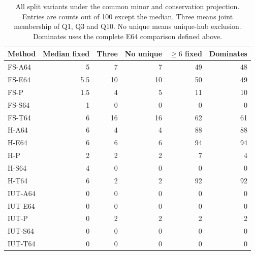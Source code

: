 \begin{table}[htbp]\centering\small\caption{All split variants under the common minor and conservation projection. Entries are counts out of 100 except the median. Three means joint membership of Q1, Q3 and Q10. No unique means unique-hub exclusion. Dominates uses the complete E64 comparison defined above.}\label{tab:split-methods}

\begin{tabular}{lrrrrr}\toprule Method & Median fixed & Three & No unique & $\ge6$ fixed & Dominates\\\midrule

FS-A64 & 5 & 7 & 7 & 49 & 48\\

FS-E64 & 5.5 & 10 & 10 & 50 & 49\\

FS-P & 1.5 & 4 & 5 & 11 & 10\\

FS-S64 & 1 & 0 & 0 & 0 & 0\\

FS-T64 & 6 & 16 & 16 & 62 & 61\\

H-A64 & 6 & 4 & 4 & 88 & 88\\

H-E64 & 6 & 6 & 6 & 94 & 94\\

H-P & 2 & 2 & 2 & 7 & 4\\

H-S64 & 4 & 0 & 0 & 0 & 0\\

H-T64 & 6 & 2 & 2 & 92 & 92\\

IUT-A64 & 0 & 0 & 0 & 0 & 0\\

IUT-E64 & 0 & 0 & 0 & 0 & 0\\

IUT-P & 0 & 2 & 2 & 2 & 2\\

IUT-S64 & 0 & 0 & 0 & 0 & 0\\

IUT-T64 & 0 & 0 & 0 & 0 & 0\\

\bottomrule\end{tabular}\end{table}


